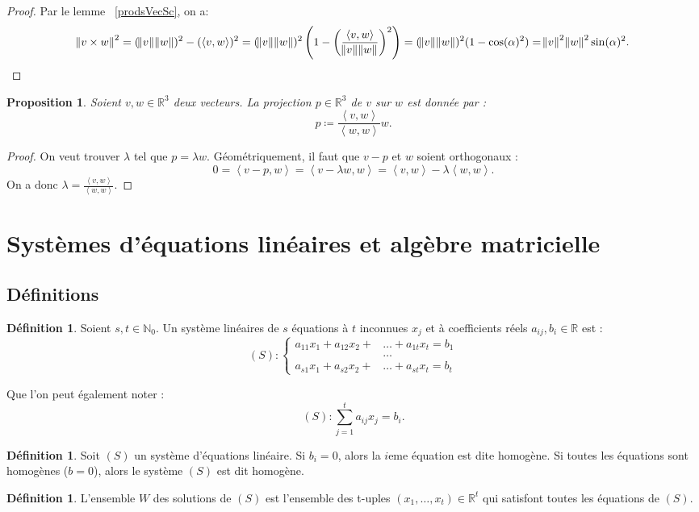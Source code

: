 \documentclass{article}
\newcommand{\N}{\mathbb N}
\newcommand{\R}{\mathbb R}
\newcommand{\scpr}[2]{\left\langle #1, #2\right\rangle}
\newtheorem{prp}[thm]{Proposition}
\theoremstyle{definition}
\newtheorem{déf}[thm]{Définition}
\theoremstyle{remark}
\begin{document}
		\begin{proof} Par le lemme ~\ref{prodsVecSc}, on a:
		\[\norm{v \times w}^2 = (\norm v\norm w)^2 - (\scpr vw)^2 = (\norm v\norm w)^2\left(1 - \left(\frac {\scpr vw}{\norm v\norm w}\right)^2\right)
		= (\norm v\norm w)^2(1-\cos(\alpha)^2) = \norm v^2\norm w^2 \sin(\alpha)^2.\] \end{proof}

		\begin{prp} Soient $v, w \in \R^3$ deux vecteurs. La projection $p \in \R^3$ de $v$ sur $w$ est donnée par :\[p \coloneqq \frac {\scpr vw}{\scpr ww}w.\] \end{prp}

		\begin{proof} On veut trouver $\lambda$ tel que $p = \lambda w$. Géométriquement, il faut que $v-p$ et $w$ soient orthogonaux :
		\[0 = \scpr {v-p}w = \scpr {v-\lambda w}w = \scpr vw - \lambda \scpr ww.\] On a donc $\lambda = \frac {\scpr vw}{\scpr ww}$. \end{proof}

\section{Systèmes d'équations linéaires et algèbre matricielle}
	\subsection{Définitions}
		\begin{déf} Soient $s, t \in \N_0$. Un système linéaires de $s$ équations à $t$ inconnues $x_j$ et à coefficients réels $a_{ij}, b_i \in \R$ est :
		\[(S) : \left\{\begin{aligned}
			a_{11}x_1 + a_{12}x_2 + &\ldots + a_{1t}x_t = b_1 \\
			&\ldots \\
			a_{s1}x_1 + a_{s2}x_2 + &\ldots + a_{st}x_t = b_t
		\end{aligned}\right.\]

		Que l'on peut également noter :
		\[(S) : \sum_{j=1}^ta_{ij}x_j = b_i\tag*{$i \in [s]$}.\]
		\end{déf}

		\begin{déf} Soit $(S)$ un système d'équations linéaire. Si $b_i = 0$, alors la $i$eme équation est dite homogène. Si toutes les équations sont homogènes ($b = 0$),
		alors le système $(S)$ est dit homogène. \end{déf}

		\begin{déf} L'ensemble $W$ des solutions de $(S)$ est l'ensemble des t-uples $(x_1, \ldots, x_t) \in \R^t$ qui satisfont toutes les équations de $(S)$. \end{déf}
\end{document}
